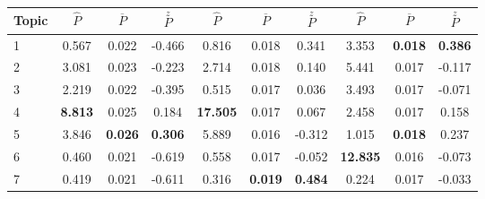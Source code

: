 \begin{singlespacing}
\begin{center}
\begin{threeparttable}
\begin{small}
\begin{tabular}{|l|c|c|c|c|c|c|c|c|c|}
        Topic                   & \textbf{$\hat{P}$} & \textbf{$\overline{P}$} & \textbf{$\stackrel{z}{P}$}& \textbf{$\hat{P}$} & \textbf{$\overline{P}$} & \textbf{$\stackrel{z}{P}$}& \textbf{$\hat{P}$} & \textbf{$\overline{P}$} & \textbf{$\stackrel{z}{P}$}\\
        \hline
        1 & 0.567   & 0.022 & -0.466    & 0.816     & 0.018 & 0.341   & 3.353     & \textbf{0.018} & \textbf{0.386}   \\
        \hline
        2 & 3.081 & 0.023   & -0.223    & 2.714     & 0.018 & 0.140   & 5.441     & 0.017 & -0.117  \\
        \hline
        3 & 2.219 & 0.022   & -0.395    & 0.515     & 0.017 & 0.036   & 3.493     & 0.017 & -0.071  \\
        \hline
        4 & \textbf{8.813} & 0.025   & 0.184     & \textbf{17.505}    & 0.017 & 0.067   & 2.458     & 0.017 & 0.158   \\
        \hline
        5 & 3.846 & \textbf{0.026} & \textbf{0.306}     & 5.889     & 0.016 & -0.312    & 1.015     & \textbf{0.018} & 0.237   \\
        \hline
        6 & 0.460 & 0.021 & -0.619    & 0.558     & 0.017 & -0.052    & \textbf{12.835}    & 0.016 & -0.073  \\
        \hline
        7 & 0.419 & 0.021 & -0.611    & 0.316     & \textbf{0.019} & \textbf{0.484}     & 0.224     & 0.017 & -0.033  \\
        \hline
        \end{tabular}
    \end{small}
    \end{threeparttable}
\end{center}
\end{singlespacing}